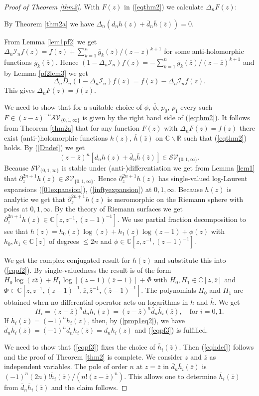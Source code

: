 \documentclass[oneside]{amsart}
\newcommand{\CC}{{\mathbb C}}
\newcommand{\RR}{{\mathbb R}}
\newcommand{\ddd}{{\overline{d}}}
\newcommand{\gggg}{{\overline{g}}}
\newcommand{\hh}{{\overline{h}}}
\newcommand{\zz}{{\overline{z}}}
\newcommand{\sI}{\mathcal{I}}
\newcommand{\sS}{\mathcal{S}}
\newcommand{\sV}{\mathcal{V}}
\theoremstyle{plain}
\begin{document}
\begin{proof}[Proof of Theorem \ref{thm2}]
With $F(z)$ in (\ref{eqthm2}) we calculate $\Delta_nF(z)$:

By Theorem \ref{thm2a} we have $\Delta_n(d_nh(z)+\ddd_n\hh(\zz))=0$.

From Lemma \ref{lem1pf2} we get $\Delta_n\sI_nf(z)=f(z)+\sum_{k=1}^n\gggg_k(\zz)/(z-\zz)^{k+1}$ for some anti-holomorphic functions $\gggg_k(\zz)$.
Hence $(1-\Delta_n\sI_n)f(z)=-\sum_{k=1}^n\gggg_k(\zz)/(z-\zz)^{k+1}$ and by Lemma \ref{pf2lem3} we get
$$
\Delta_nD_n(1-\Delta_n\sI_n)f(z)=f(z)-\Delta_n\sI_nf(z).
$$
This gives $\Delta_nF(z)=f(z)$.

We need to show that for a suitable choice of $\phi$, $\overline{\phi}$, $p_0$, $p_1$ every such $F\in(z-\zz)^{-n}\sS\sV_{\{0,1,\infty\}}$ is given by the right hand side of (\ref{eqthm2}).
It follows from Theorem \ref{thm2a} that for any function $F(z)$ with $\Delta_nF(z)=f(z)$ there exist (anti-)holomorphic functions $h(z)$, $\hh(\zz)$ on $\CC\backslash\RR$ such
that (\ref{eqthm2}) holds. By (\ref{Dndef}) we get
\begin{equation}\label{eqpf2}
(z-\zz)^n[d_nh(z)+\ddd_n\hh(\zz)]\in\sS\sV_{\{0,1,\infty\}}.
\end{equation}
Because $\sS\sV_{\{0,1,\infty\}}$ is stable under (anti-)differentiation we get from Lemma \ref{lem1} that $\partial_z^{2n+1}h(z)\in\sS\sV_{\{0,1,\infty\}}$.
Hence $\partial_z^{2n+1}h(z)$ has single-valued log-Laurent expansions (\ref{01expansion}), (\ref{inftyexpansion}) at $0,1,\infty$. Because $h(z)$ is analytic we get that $\partial_z^{2n+1}h(z)$ is
meromorphic on the Riemann sphere with poles at $0,1,\infty$. By the theory of Riemann surfaces we get $\partial_z^{2n+1}h(z)\in\CC[z,z^{-1},(z-1)^{-1}]$.
We use partial fraction decomposition to see that $h(z)=h_0(z)\log(z)+h_1(z)\log(z-1)+\phi(z)$ with $h_0,h_1\in\CC[z]$ of degrees $\leq2n$ and $\phi\in\CC[z,z^{-1},(z-1)^{-1}]$.

We get the complex conjugated result for $\hh(\zz)$ and substitute this into (\ref{eqpf2}). By single-valuedness the result is of the form
$H_0\log(z\zz)+H_1\log[(z-1)(\zz-1)]+\Phi$ with $H_0,H_1\in\CC[z,\zz]$ and $\Phi\in\CC[z,z^{-1},(z-1)^{-1},\zz,\zz^{-1},(\zz-1)^{-1}]$.
The polynomials $H_0$ and $H_1$ are obtained when no differential operator acts on logarithms in $h$ and $\hh$. We get
\begin{equation}\label{eqpf3}
H_i=(z-\zz)^nd_nh_i(z)=(z-\zz)^n\ddd_n\hh_i(\zz),\quad\text{for }i=0,1.
\end{equation}
If $\hh_i(\zz)=(-1)^nh_i(\zz)$, then, by (\ref{prop1eq2}), we have $\ddd_n\hh_i(\zz)=(-1)^n\ddd_nh_i(\zz)=d_nh_i(z)$ and (\ref{eqpf3}) is fulfilled.

We need to show that (\ref{eqpf3}) fixes the choice of $\hh_i(\zz)$. Then (\ref{eqhdef}) follows and the proof of Theorem \ref{thm2} is complete.
We consider $z$ and $\zz$ as independent variables. The pole of order $n$ at $z=\zz$ in $\ddd_n\hh_i(\zz)$ is $(-1)^n(2n)!\hh_i(\zz)/(n!(z-\zz)^n)$.
This allows one to determine $\hh_i(\zz)$ from $\ddd_n\hh_i(\zz)$ and the claim follows.
\end{proof}
\end{document}
